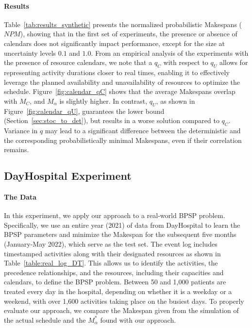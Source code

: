 
\paragraph{Results} Table~\ref{tab:results_synthetic} presents the normalized probabilistic Makespans ($NPM$), showing that in the first set of experiments, the presence or absence of calendars does not significantly impact performance, except for the  size at uncertainty levels $0.1$ and $1.0$. 
From an empirical analysis of the experiments with the presence of resource calendars, we note that a $q_C$ with respect to $q_U$ allows for representing activity durations closer to real times, enabling it to effectively leverage the planned availability and unavailability of resources to optimize the schedule.
Figure~\ref{fig:calendar_qC} shows that the average Makespans overlap with $M_C$, and $M_\alpha$ is slightly higher.  In contrast, $q_U$, as shown in Figure~\ref{fig:calendar_qU}, guarantees the lower bound (Section~\ref{sec:stoc_to_det}), but results in a worse solution compared to $q_C$.
Variance in $q$ may lead to a significant difference between the deterministic and the corresponding probabilistically minimal Makespans, even if their correlation remains. 


\subsection{DayHospital Experiment} 

\paragraph{The Data} In this experiment, we apply our approach to a real-world BPSP problem. Specifically, we use an entire year (2021) of data from DayHospital to learn the BPSP parameters and minimize the Makespan for the subsequent five months (January-May 2022), which serve as the test set.
The event log includes timestamped activities along with their designated resources as shown in Table~\ref{table:real_log_DT}. This allows us to identify the activities, the precedence relationships, and the resources, including their capacities and calendars, to define the BPSP problem.
Between 50 and 1,000 patients are treated every day in the hospital, depending on whether it is a weekday or a weekend, with over 1,600 activities taking place on the busiest days. 
To properly evaluate our approach, we compare the Makespan given from the simulation of the actual schedule and the $M^*_{\alpha}$ found with our approach.



